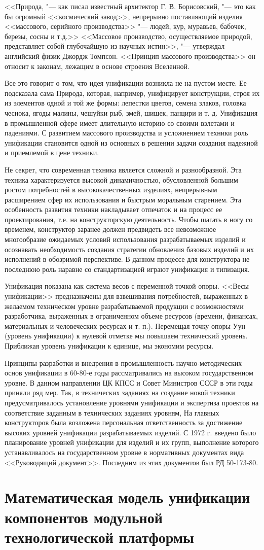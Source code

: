 <<Природа, "--- как писал известный архитектор Г. В. Борисовский, "--- это как бы огромный <<космический завод>>, непрерывно поставляющий изделия <<массового, серийного производства>> "--- людей, кур, муравьев, бабочек, березы, сосны и т.\:д.>> <<Массовое производство, осуществляемое природой, представляет собой глубочайшую из научных истин>>, "--- утверждал английский физик Джордж Томпсон. <<Принцип массового производства>> он относит к законам, лежащим в основе строения Вселенной.

Все это говорит о том, что идея унификации возникла не на пустом месте. Ее подсказала сама Природа, которая, например, унифицирует конструкции, строя их из элементов одной и той же формы: лепестки цветов, семена злаков, головка чеснока, ягоды малины, чешуйки рыб, змей, шишек, панцири и т. д. Унификация в промышленной сфере имеет длительную историю со своими взлетами и падениями. С развитием массового производства и усложнением техники роль унификации становится одной из основных в решении задачи создания надежной и приемлемой в цене техники.

Не секрет, что современная техника является сложной и разнообразной. Эта техника характеризуется высокой динамичностью, обусловленной большим ростом потребностей в высококачественных изделиях, непрерывным расширением сфер их использования и быстрым моральным старением. Эта особенность развития техники накладывает отпечаток и на процесс ее проектирования, т.\:е. на конструкторскую деятельность. Чтобы шагать в ногу со временем, конструктор заранее должен предвидеть все невозможное многообразие ожидаемых условий использования разрабатываемых изделий и осознавать необходимость создания стратегии обновления базовых изделий и их исполнений в обозримой перспективе. В данном процессе для конструктора не последнюю роль наравне со стандартизацией играют унификация и типизация.

Унификация показана как система весов с переменной точкой опоры. <<Весы унификации>> предназначены для взвешивания потребностей, выраженных в желаемом техническом уровне разрабатываемой продукции с возможностями разработчика, выраженных в ограниченном объеме ресурсов (времени, финансах, материальных и человеческих ресурсах и т. п.). Перемещая точку опоры Уун (уровень унификации) к нулевой отметке мы повышаем технический уровень. Приближая уровень унификации к единице, мы экономим ресурсы.

Принципы разработки и внедрения в промышленность научно-методических основ унификации в 60-80-е годы рассматривались на высоком государственном уровне. В данном направлении ЦК КПСС и Совет Министров СССР в эти годы приняли ряд мер. Так, в технических заданиях на создание новой техники предусматривалось установление уровнями унификации и экспертиза проектов на соответствие заданным в технических заданиях уровням, На главных конструкторов была возложена персональная ответственность за достижение высоких уровней унификации разрабатываемых изделий. С 1972 г. введено было планирование уровней унификации для изделий и их групп, выполнение которого устанавливалось на государственном уровне в нормативных документах вида <<Руководящий документ>>. Последним из этих документов был РД 50-173-80.

\section{Математическая модель унификации компонентов модульной технологической платформы}



\FloatBarrier